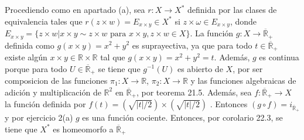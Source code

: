 \documentclass{article}
\begin{document}
Procediendo como en apartado (a), sea $r:X\rightarrow X^*$ definida por las clases de equivalencia tales que $r(z\times w)=E_{x\times y}\in X^*$ si  $z\times \omega\in E_{x\times y}$, donde $E_{x\times y}=\{z\times w| x\times y\sim z\times w \text{ para }x\times y,z\times w\in X\}$. La función $g:X\rightarrow \overline{\mathbb{R}}_+$ definida como $g(x\times y )=x^2+y^2$ es suprayectiva, ya que para todo $t\in\overline{\mathbb{R}}_+$ existe algún $x\times y \in \mathbb{R}\times \mathbb{R}$ tal que $g(x\times y )=x^2+y^2= t$. Además, $g$ es continua porque para todo $U\in \overline{\mathbb{R}}_+$ se tiene que $g^{-1}(U)$ es abierto de $X$, por ser composicion de las funciones $\pi_1:X\rightarrow \mathbb{R}$, $\pi_2:X\rightarrow \mathbb{R}$ y las funciones algebraicas de adición y multiplicación de $\mathbb{R}^2$ en $\overline{\mathbb{R}}_+$, por teorema 21.5. Además, sea $f:\overline{\mathbb{R}}_+\rightarrow X$ la función definida por $f(t)=(\sqrt{|t|/2})\times(\sqrt{|t|/2})$ . Entonces $(g\circ f)=i_{\overline{\mathbb{R}}_+}$ y por ejercicio 2(a) $g$ es una función cociente. Entonces, por corolario 22.3, se tiene que $X^*$ es homeomorfo a $\overline{\mathbb{R}}_+$  
\end{document}

